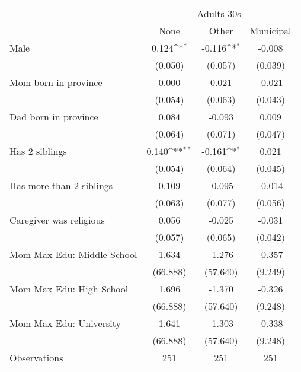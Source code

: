 {
\def\sym#1{\ifmmode^{#1}\else\(^{#1}\)\fi}
\begin{tabular}{l*{3}{c}}
\toprule
& \multicolumn{3}{c}{Adults 30s} \\
                    &\multicolumn{1}{c}{None}&\multicolumn{1}{c}{Other}&\multicolumn{1}{c}{Municipal}\\
\midrule
Male                &       0.124\sym{*}  &      -0.116\sym{*}  &      -0.008         \\
                    &     (0.050)         &     (0.057)         &     (0.039)         \\
\addlinespace
Mom born in province&       0.000         &       0.021         &      -0.021         \\
                    &     (0.054)         &     (0.063)         &     (0.043)         \\
\addlinespace
Dad born in province&       0.084         &      -0.093         &       0.009         \\
                    &     (0.064)         &     (0.071)         &     (0.047)         \\
\addlinespace
Has 2 siblings      &       0.140\sym{**} &      -0.161\sym{*}  &       0.021         \\
                    &     (0.054)         &     (0.064)         &     (0.045)         \\
\addlinespace
Has more than 2 siblings&       0.109         &      -0.095         &      -0.014         \\
                    &     (0.063)         &     (0.077)         &     (0.056)         \\
\addlinespace
Caregiver was religious&       0.056         &      -0.025         &      -0.031         \\
                    &     (0.057)         &     (0.065)         &     (0.042)         \\
\addlinespace
Mom Max Edu: Middle School&       1.634         &      -1.276         &      -0.357         \\
                    &    (66.888)         &    (57.640)         &     (9.249)         \\
\addlinespace
Mom Max Edu: High School&       1.696         &      -1.370         &      -0.326         \\
                    &    (66.888)         &    (57.640)         &     (9.248)         \\
\addlinespace
Mom Max Edu: University&       1.641         &      -1.303         &      -0.338         \\
                    &    (66.888)         &    (57.640)         &     (9.248)         \\
\midrule
Observations        &         251         &         251         &         251         \\
\bottomrule
\end{tabular}
}
